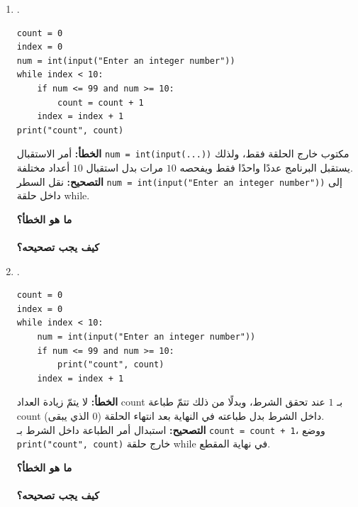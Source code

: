 \documentclass[14pt]{extarticle}
\begin{document}
\begin{enumerate}[label=\textbf{تمرين \arabic*:}, wide=0pt, itemsep=2.2em]
\begin{enumerate}[label=\textbf{مقطع \alph*:}, wide=0pt, itemsep=1.5em]
\item .
\begin{boxCode}
\begin{english}
\begin{verbatim}
count = 0
index = 0
num = int(input("Enter an integer number"))
while index < 10:
    if num <= 99 and num >= 10:
        count = count + 1
    index = index + 1
print("count", count)
\end{verbatim}
\end{english}
\end{boxCode}
\ifwithsols
\begin{boxSolution}
\textbf{الخطأ:} أمر الاستقبال \textenglish{\texttt{num = int(input(...))}} مكتوب خارج الحلقة فقط، ولذلك يستقبل البرنامج عددًا واحدًا فقط ويفحصه $10$ مرات بدل استقبال $10$ أعداد مختلفة. \\
\textbf{التصحيح:} نقل السطر \textenglish{\texttt{num = int(input("Enter an integer number"))}} إلى داخل حلقة \textenglish{while}.
\end{boxSolution}
\else
\vspace{0.5cm}
\textbf{ما هو الخطأ؟} \hrulefill \\
 \\
\textbf{كيف يجب تصحيحه؟} \hrulefill
\fi
\filbreak

\item .
\begin{boxCode}
\begin{english}
\begin{verbatim}
count = 0
index = 0
while index < 10:
    num = int(input("Enter an integer number"))
    if num <= 99 and num >= 10:
        print("count", count)
    index = index + 1
\end{verbatim}
\end{english}
\end{boxCode}
\ifwithsols
\begin{boxSolution}
\textbf{الخطأ:} لا يتمّ زيادة العداد \textenglish{count} بـ $1$ عند تحقق الشرط، وبدلًا من ذلك تتمّ طباعة \textenglish{count} (الذي يبقى $0$) داخل الشرط بدل طباعته في النهاية بعد انتهاء الحلقة. \\
\textbf{التصحيح:} استبدال أمر الطباعة داخل الشرط بـ \textenglish{\texttt{count = count + 1}}، ووضع \textenglish{\texttt{print("count", count)}} خارج حلقة \textenglish{while} في نهاية المقطع.
\end{boxSolution}
\else
\vspace{0.5cm}
\textbf{ما هو الخطأ؟} \hrulefill \\
 \\
\textbf{كيف يجب تصحيحه؟} \hrulefill
\fi
\filbreak


\end{enumerate}
\end{enumerate}
\end{document}
